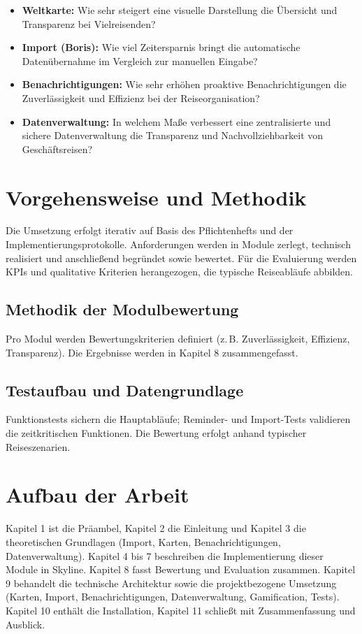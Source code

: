 \begin{itemize}
  \item \textbf{Weltkarte:} Wie sehr steigert eine visuelle Darstellung
  die Übersicht und Transparenz bei Vielreisenden?
  \item \textbf{Import (Boris):} Wie viel Zeitersparnis bringt die automatische
  Datenübernahme im Vergleich zur manuellen Eingabe?
  \item \textbf{Benachrichtigungen:} Wie sehr erhöhen proaktive
  Benachrichtigungen die Zuverlässigkeit und Effizienz bei der Reiseorganisation?
  \item \textbf{Datenverwaltung:} In welchem Maße verbessert eine
  zentralisierte und sichere Datenverwaltung die Transparenz und
  Nachvollziehbarkeit von Geschäftsreisen?
\end{itemize}

\section{Vorgehensweise und Methodik}
Die Umsetzung erfolgt iterativ auf Basis des Pflichtenhefts und der
Implementierungsprotokolle. Anforderungen werden in Module zerlegt,
technisch realisiert und anschließend begründet sowie bewertet.
Für die Evaluierung werden KPIs und qualitative Kriterien herangezogen,
die typische Reiseabläufe abbilden.
\subsection{Methodik der Modulbewertung}
Pro Modul werden Bewertungskriterien definiert (z.\,B. Zuverlässigkeit,
Effizienz, Transparenz). Die Ergebnisse werden in Kapitel 8 zusammengefasst.
\subsection{Testaufbau und Datengrundlage}
Funktionstests sichern die Hauptabläufe; Reminder- und Import-Tests
validieren die zeitkritischen Funktionen. Die Bewertung erfolgt anhand
typischer Reiseszenarien.

\section{Aufbau der Arbeit}
Kapitel 1 ist die Präambel, Kapitel 2 die Einleitung und Kapitel 3 die theoretischen
Grundlagen (Import, Karten, Benachrichtigungen, Datenverwaltung). Kapitel 4 bis 7
beschreiben die Implementierung dieser Module in Skyline. Kapitel 8 fasst Bewertung
und Evaluation zusammen. Kapitel 9 behandelt die technische Architektur sowie die
projektbezogene Umsetzung (Karten, Import, Benachrichtigungen, Datenverwaltung,
Gamification, Tests). Kapitel 10 enthält die Installation, Kapitel 11 schließt mit
Zusammenfassung und Ausblick.

